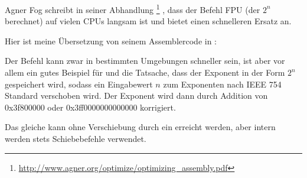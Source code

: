 Agner Fog schreibt in seiner Abhandlung  \footnote{\url{http://www.agner.org/optimize/optimizing_assembly.pdf}} , dass der Befehl 
\ac{FPU} (der $2^n$ berechnet) auf vielen CPUs langsam ist und bietet einen schnelleren Ersatz an.

Hier ist meine Übersetzung von seinem Assemblercode in \CCpp:


Der Befehl  kann zwar in bestimmten Umgebungen schneller sein, ist aber vor allem ein gutes Beispiel für
 und die Tatsache, dass der Exponent in der Form $2^n$ gespeichert wird, sodass ein Eingabewert $n$ zum
Exponenten nach IEEE 754 Standard verschoben wird.
Der Exponent wird dann durch Addition von 0x3f800000 oder 0x3ff0000000000000 korrigiert.

Das gleiche kann ohne Verschiebung durch ein  erreicht werden, aber intern werden stets Schiebebefehle
verwendet.
